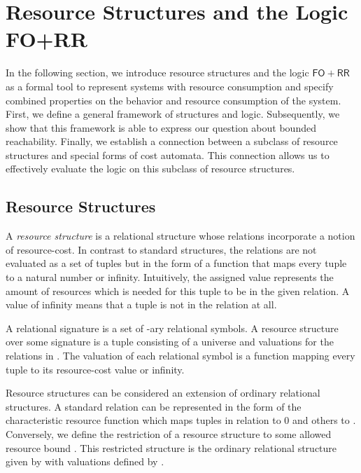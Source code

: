 \documentclass{LMCS}
\newcommand{\FORR}{\ensuremath{\mathsf{FO\!\!+\!\!RR}}}
\begin{document}
\section{Resource Structures and the Logic FO+RR}
\label{sec:ResourceStructuresAndLogic}

In the following section, we introduce resource structures and the logic
\FORR{} as a formal tool to represent systems with resource consumption and
specify combined properties on the behavior and resource consumption
of the system. First, we define a general framework of structures and logic.
Subsequently, we show that this framework is able to express our question
about bounded reachability. Finally, we establish a connection between a
subclass of resource structures and special forms of cost automata. This
connection allows us to effectively evaluate the logic on this subclass of resource
structures.

\subsection{Resource Structures}
\label{subsec:ResourceStructures}

A \emph{resource structure} is a relational structure whose relations
incorporate a notion of resource-cost. In contrast to standard structures, the
relations are not evaluated as a set of tuples but in the form of a function that
maps every tuple to a natural number or infinity. Intuitively, the assigned
value represents the amount of resources which is needed for this tuple to be in the
given relation. A value of infinity means that a tuple is not in the relation 
at all. 

\begin{defi}
 A relational signature  is a set of -ary
relational symbols. A resource structure over some signature  is a tuple
 consisting
of a universe  and  valuations  for
the relations in . The valuation of each relational symbol is a function
 mapping every tuple to its resource-cost
value or infinity.
\end{defi}

Resource structures can be considered an extension of ordinary
relational structures. A standard relation can be represented in the form
of the characteristic resource function which maps tuples in relation to
0 and others to . Conversely, we define the restriction of a
resource structure  to some allowed resource bound . This restricted structure is the ordinary relational structure
given by  with valuations defined by
.
\end{document}
